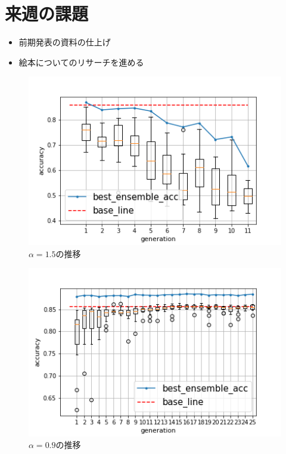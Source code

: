 \documentclass[twocolumn]{jarticle}     %
\begin{document}
\section{来週の課題}
\begin{itemize}
	\item 前期発表の資料の仕上げ
	\item 絵本についてのリサーチを進める
\end{itemize}


\begin{figure}[h]
	\centering
	\includegraphics[scale=0.6]{graph_5.png}
	\caption{$\alpha =1.5$の推移\label{fig:graph2}}
\end{figure}

\begin{figure}[h]
	\centering
	\includegraphics[scale=0.6]{graph_6.png}
	\caption{$\alpha =0.9$の推移\label{fig:graph3}}
\end{figure}
\end{document}
